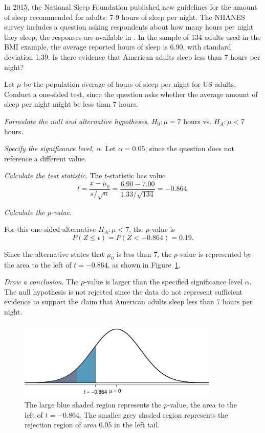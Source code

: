 \begin{examplewrap}
\begin{nexample}{In 2015, the National Sleep Foundation published new guidelines for the amount of sleep recommended for adults: 7-9 hours of sleep per night.\footnotemark{} The NHANES survey includes a question asking respondents about how many hours per night they sleep; the responses are available in . In the sample of 134 adults used in the BMI example, the average reported hours of sleep is 6.90, with standard deviation 1.39. Is there evidence that American adults sleep less than 7 hours per night?}

Let $\mu$ be the population average of hours of sleep per night for US adults. Conduct a one-sided test, since the question asks whether the average amount of sleep per night might be less than 7 hours. 

\textit{Formulate the null and alternative hypotheses}. $H_0: \mu = 7$ hours vs. $H_A: \mu < 7$ hours.

\textit{Specify the significance level, $\alpha$}.  Let $\alpha = 0.05$, since the question does not reference a different value. 

\textit{Calculate the test statistic}. The $t$-statistic has value
\[t = \frac{\overline{x}-\mu_0}{s/\sqrt{n}} = \frac{6.90 - 7.00} {1.33/\sqrt{134}} = -0.864.\]

\textit{Calculate the $p$-value}.

For this one-sided alternative $H_A: \mu < 7$, the $p$-value is
\[P(Z \leq t) = P(Z < -0.864) = 0.19.\]

Since the alternative states that $\mu_0$ is less than 7, the $p$-value is represented by the area to the left of $t = -0.864$, as shown in Figure~\ref{pValueSleep}.

\textit{Draw a conclusion}.  The $p$-value is larger than the specified significance level $\alpha$. The null hypothesis is not rejected since the data do not represent sufficient evidence to support the claim that American adults sleep less than 7 hours per night.
\end{nexample}
\end{examplewrap}


\begin{figure}[h]
	\centering
	\includegraphics[width=0.85\textwidth]{ch_05a_inference_foundations_oi_biostat/figures/pValueSleep/pValueSleep}
	\caption{The large blue shaded region represents the $p$-value, the area to the left of $t = -0.864$. The smaller grey shaded region represents the rejection region of area 0.05 in the left tail.}
	\label{pValueSleep}
\end{figure}

